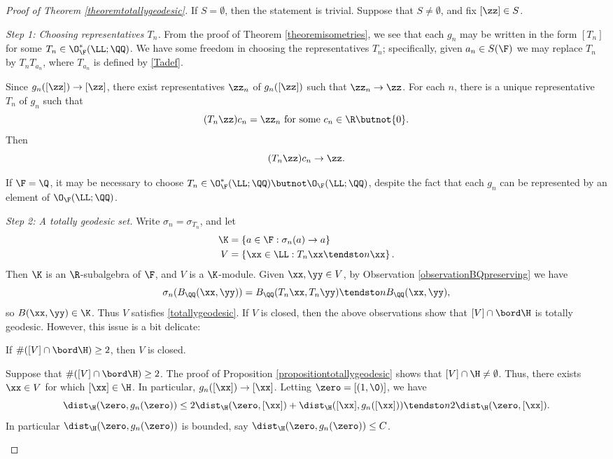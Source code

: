 \begin{proof}[Proof of Theorem \ref{theoremtotallygeodesic}]
If $S = \emptyset$, then the statement is trivial. Suppose that $S\neq\emptyset$, and fix $[\zz]\in S$.

{\it Step 1: Choosing representatives $T_n$.} From the proof of Theorem \ref{theoremisometries}, we see that each $g_n$ may be written in the form $[T_n]$ for some $T_n\in\O_\F^*(\LL;\QQ)$. We have some freedom in choosing the representatives $T_n$; specifically, given $a_n\in S(\F)$ we may replace $T_n$ by $T_n T_{a_n}$, where $T_{a_n}$ is defined by \eqref{Tadef}.

Since $g_n([\zz])\to [\zz]$, there exist representatives $\zz_n$ of $g_n([\zz])$ such that $\zz_n\to \zz$. For each $n$, there is a unique representative $T_n$ of $g_n$ such that
\[
(T_n \zz) c_n = \zz_n \text{ for some $c_n\in\R\butnot\{0\}$.}
\]
Then
\[
(T_n \zz) c_n \to \zz.
\]
\begin{remark}
If $\F = \Q$, it may be necessary to choose $T_n\in\O_\F^*(\LL;\QQ)\butnot\O_\F(\LL;\QQ)$, despite the fact that each $g_n$ can be represented by an element of $\O_\F(\LL;\QQ)$.
\end{remark}

{\it Step 2: A totally geodesic set.}
Write $\sigma_n = \sigma_{T_n}$, and let
\begin{align*}
\K &= \{a\in \F : \sigma_n(a)\to a\}\\
V &= \left\{\xx\in\LL : T_n \xx \tendsto n \xx\right\}.
\end{align*}
Then $\K$ is an $\R$-subalgebra of $\F$, and $V$ is a $\K$-module. Given $\xx,\yy\in V$, by Observation \ref{observationBQpreserving} we have
\[
\sigma_n(B_\QQ(\xx,\yy)) = B_\QQ(T_n\xx,T_n\yy) \tendsto n B_\QQ(\xx,\yy),
\]
so $B(\xx,\yy)\in \K$. Thus $V$ satisfies \eqref{totallygeodesic}. If $V$ is closed, then the above observations show that $[V]\cap\bord\H$ is totally geodesic. However, this issue is a bit delicate:

\begin{claim}
If $\#([V]\cap\bord\H)\geq 2$, then $V$ is closed.
\end{claim}
\begin{subproof}
Suppose that $\#([V]\cap\bord\H)\geq 2$. The proof of Proposition \ref{propositiontotallygeodesic} shows that $[V]\cap\H\neq\emptyset$. Thus, there exists $\xx\in V$ for which $[\xx]\in\H$. In particular, $g_n([\xx])\to [\xx]$. Letting $\zero = [(1,\0)]$, we have
\[
\dist_\H(\zero,g_n(\zero)) \leq 2\dist_\H(\zero,[\xx]) + \dist_\H([\xx],g_n([\xx])) \tendsto n 2\dist_\H(\zero,[\xx]).
\]
In particular $\dist_\H(\zero,g_n(\zero))$ is bounded, say $\dist_\H(\zero,g_n(\zero)) \leq C$.


\end{subproof}
\end{proof}
